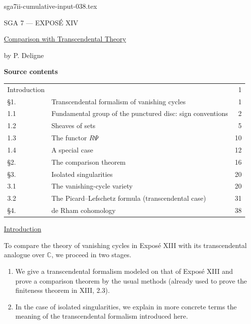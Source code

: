 \begin{filecontents*}{sga7ii-cumulative-input-038.tex}
\clearpage
\begin{center}
{\large SGA 7 --- EXPOS\'E XIV}\par
\vspace{2em}
{\Large\underline{Comparison with Transcendental Theory}}\par
\vspace{1.5em}
{\large by P. Deligne}
\end{center}

\medskip
\noindent\textbf{Source contents}
\begin{center}
\begin{tabular}{@{}llr@{}}
Introduction && 1\\
\S1. & Transcendental formalism of vanishing cycles & 1\\
1.1 & Fundamental group of the punctured disc: sign conventions & 2\\
1.2 & Sheaves of sets & 5\\
1.3 & The functor $R\Psi$ & 10\\
1.4 & A special case & 12\\
\S2. & The comparison theorem & 16\\
\S3. & Isolated singularities & 20\\
3.1 & The vanishing-cycle variety & 20\\
3.2 & The Picard--Lefschetz formula (transcendental case) & 31\\
\S4. & de Rham cohomology & 38
\end{tabular}
\end{center}

\medskip
\underline{Introduction}

To compare the theory of vanishing cycles in Expos\'e XIII with its
transcendental analogue over $\mathbb C$, we proceed in two stages.

\begin{enumerate}[label=(\alph*),leftmargin=2.6em]
\item We give a transcendental formalism modeled on that of
Expos\'e XIII and prove a comparison theorem by the usual methods
(already used to prove the finiteness theorem in XIII, 2.3).

\item In the case of isolated singularities, we explain in more
concrete terms the meaning of the transcendental formalism introduced
here.
\end{enumerate}


\end{filecontents*}
